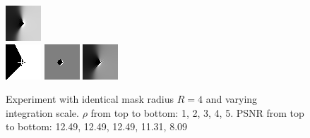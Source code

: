 \begin{figure}[h]
    \includegraphics[width=0.2\linewidth]{../Images/disctest/flatcorner4inpaint.png}\\
    \vspace*{0.2cm}
    \includegraphics[width=0.2\linewidth]{../Images/disctest/flatcorner5.png}\hspace{0.2cm}
    \includegraphics[width=0.2\linewidth]{../Images/disctest/flatcorner5mask.png}\hspace{0.2cm}
    \includegraphics[width=0.2\linewidth]{../Images/disctest/flatcorner5inpaint.png}\\
    \caption{Experiment with identical mask radius $R=4$ and varying integration scale. $\rho$ from top to bottom:
    1, 2, 3, 4, 5. PSNR from top to bottom: 12.49, 12.49, 12.49, 11.31, 8.09}\label{fig:MaskEx}
\end{figure}


